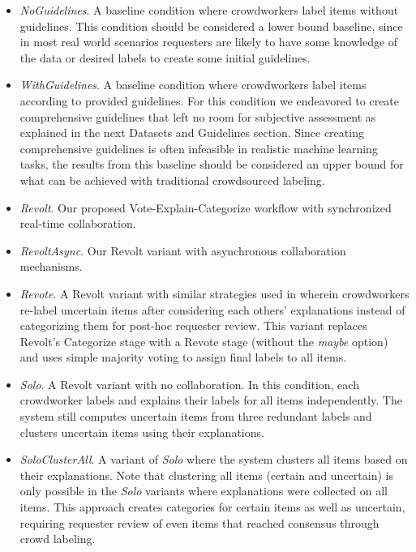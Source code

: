 \begin{itemize}
    \setlength\itemsep{-0.2em}
	\item \emph{NoGuidelines}. A baseline condition where crowdworkers label items without guidelines. This condition should be considered a lower bound baseline, since in most real world scenarios requesters are likely to have some knowledge of the data or desired labels to create some initial guidelines. 
	\item \emph{WithGuidelines}. A baseline condition where crowdworkers label items according to provided guidelines. For this condition we endeavored to create comprehensive guidelines that left no room for subjective assessment as explained in the next Datasets and Guidelines section. Since creating comprehensive guidelines is often infeasible in realistic machine learning tasks, the results from this baseline should be considered an upper bound for what can be achieved with traditional crowdsourced labeling.
	\item \emph{Revolt}. Our proposed Vote-Explain-Categorize workflow with synchronized real-time collaboration.
	\item \emph{RevoltAsync}. Our Revolt variant with asynchronous collaboration mechanisms.
	\item \emph{Revote}. A Revolt variant with similar strategies used in \cite{drapeau2016microtalk} wherein crowdworkers re-label uncertain items after considering each others' explanations instead of categorizing them for post-hoc requester review. This variant replaces Revolt's Categorize stage with a Revote stage (without the \emph{maybe} option) and uses simple majority voting to assign final labels to all items.
	\item \emph{Solo}. A Revolt variant with no collaboration. In this condition, each crowdworker labels and explains their labels for all items independently. The system still computes uncertain items from three redundant labels and clusters uncertain items using their explanations.
	\item \emph{SoloClusterAll}. A variant of \emph{Solo} where the system clusters all items based on their explanations. Note that clustering all items (certain and uncertain) is only possible in the \emph{Solo} variants where explanations were collected on all items. This approach creates categories for certain items as well as uncertain, requiring requester review of even items that reached consensus through crowd labeling.  
\end{itemize}

